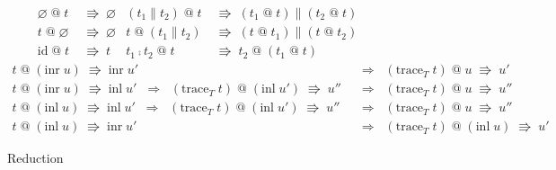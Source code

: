 \documentclass[a4j, dvipdfmx]{jsarticle}
\theoremstyle{definition}
\newcommand{\reduct}[2]{#1 &\;\Rrightarrow\; #2}
\newcommand{\reduction}[2]{#1 \;\Rrightarrow\; #2}
\begin{document}
\begin{figure}[H]
  \begin{align*}
    \reduct{\varnothing\;\text{@}\;t}{\varnothing} &
    \reduct{(t_1\parallel{}t_2)\;\text{@}\;t}{(t_1\;\text{@}\;t)\parallel(t_2\;\text{@}\;t)} \\
    \reduct{t\;\text{@}\;\varnothing}{\varnothing} &
    \reduct{t\;\text{@}\;(t_1\parallel{}t_2)}{(t\;\text{@}\;t_1)\parallel(t\;\text{@}\;t_2)} \\
    \reduct{\text{id}\;\text{@}\;t}{t} &
    \reduct{t_1\fcmp{}t_2\;\text{@}\;t}{t_2\;\text{@}\;(t_1\;\text{@}\;t)}
  \end{align*}
  \begin{align*}
    \reduction{t\;\text{@}\;(\text{inr}\;u)}{\text{inr}\;u'} &\;\;\Longrightarrow\;\; \reduction{(\text{trace}_T\;t)\;\text{@}\;u}{u'} \\
    \reduction{t\;\text{@}\;(\text{inr}\;u)}{\text{inl}\;u'} \;\;\Longrightarrow\;\; \reduction{(\text{trace}_T\;t)\;\text{@}\;(\text{inl}\;u')}{u''} &\;\;\Longrightarrow\;\; \reduction{(\text{trace}_T\;t)\;\text{@}\;u}{u''} \\
    \reduction{t\;\text{@}\;(\text{inl}\;u)}{\text{inl}\;u'} \;\;\Longrightarrow\;\; \reduction{(\text{trace}_T\;t)\;\text{@}\;(\text{inl}\;u')}{u''} &\;\;\Longrightarrow\;\; \reduction{(\text{trace}_T\;t)\;\text{@}\;u}{u''} \\
    \reduction{t\;\text{@}\;(\text{inl}\;u)}{\text{inr}\;u'} &\;\;\Longrightarrow\;\; \reduction{(\text{trace}_T\;t)\;\text{@}\;(\text{inl}\;u)}{u'}
  \end{align*}
  \caption{Reduction}
  \label{fig:reduction}
\end{figure}
\end{document}
